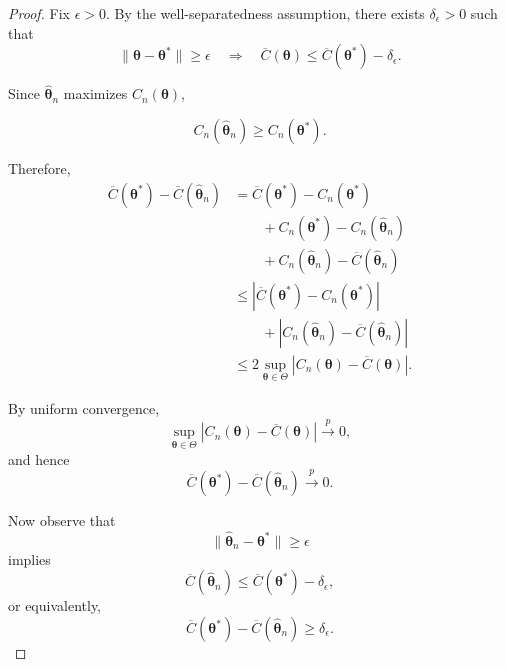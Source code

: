 \documentclass[pdflatex,sn-mathphys-ay]{sn-jnl}%
\let\oldtheta\theta
\renewcommand{\theta}{\boldsymbol{\oldtheta}}
\theoremstyle{thmstyleone}%
\theoremstyle{thmstyletwo}%
\theoremstyle{thmstylethree}%
\begin{document}
\begin{proof}

Fix $\epsilon>0$. By the well-separatedness assumption, there exists $ \delta_\epsilon>0$ such that
\[
    \|\boldsymbol{\theta}-\boldsymbol{\theta}^*\|
    \geq
    \epsilon
    \quad
    \Longrightarrow
    \quad
    \overline{C}(\boldsymbol{\theta})
    \leq
    \overline{C}(\boldsymbol{\theta}^*)
    -
    \delta_\epsilon.
\]

Since $ \widehat{\boldsymbol{\theta}}_n$ maximizes $ C_n(\boldsymbol{\theta})$,

\[
    C_n(\widehat{\boldsymbol{\theta}}_n)
    \geq
    C_n(\boldsymbol{\theta}^*).
\]

Therefore,
\begin{align}
    \overline{C}(\boldsymbol{\theta}^*)
    -
    \overline{C}(\widehat{\boldsymbol{\theta}}_n)
    &=
    \overline{C}(\boldsymbol{\theta}^*)
    -
    C_n(\boldsymbol{\theta}^*)
    \nonumber\\
    &\qquad
    +
    C_n(\boldsymbol{\theta}^*)
    -
    C_n(\widehat{\boldsymbol{\theta}}_n)
    \nonumber\\
    &\qquad
    +
    C_n(\widehat{\boldsymbol{\theta}}_n)
    -
    \overline{C}(\widehat{\boldsymbol{\theta}}_n)
    \nonumber\\
    &\leq
    \left|
        \overline{C}(\boldsymbol{\theta}^*)
        -
        C_n(\boldsymbol{\theta}^*)
    \right|
    \nonumber\\
    &\qquad
    +
    \left|
        C_n(\widehat{\boldsymbol{\theta}}_n)
        -
        \overline{C}(\widehat{\boldsymbol{\theta}}_n)
    \right|
    \nonumber\\
    &\leq
    2
    \sup_{\boldsymbol{\theta}\in\Theta}
    \left|
        C_n(\boldsymbol{\theta})
        -
        \overline{C}(\boldsymbol{\theta})
    \right|.
\end{align}

By uniform convergence,
\[
    \sup_{\boldsymbol{\theta}\in\Theta}
    \left|
        C_n(\boldsymbol{\theta})
        -
        \overline{C}(\boldsymbol{\theta})
    \right|
    \xrightarrow{p}
    0,
\]
and hence
\[
    \overline{C}(\boldsymbol{\theta}^*)
    -
    \overline{C}(\widehat{\boldsymbol{\theta}}_n)
    \xrightarrow{p}
    0.
\]

Now observe that
\[
    \|\widehat{\boldsymbol{\theta}}_n
    -
    \boldsymbol{\theta}^*\|
    \geq
    \epsilon
\]
implies
\[
    \overline{C}(\widehat{\boldsymbol{\theta}}_n)
    \leq
    \overline{C}(\boldsymbol{\theta}^*)
    -
    \delta_\epsilon,
\]
or equivalently,
\[
    \overline{C}(\boldsymbol{\theta}^*)
    -
    \overline{C}(\widehat{\boldsymbol{\theta}}_n)
    \geq
    \delta_\epsilon.
\]


\end{proof}
\end{document}
